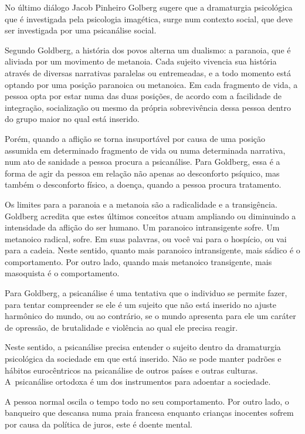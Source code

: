  

No último diálogo Jacob Pinheiro Golberg sugere que a dramaturgia
psicológica que é investigada pela psicologia imagética, surge num
contexto social, que deve ser investigada por uma psicanálise social.

Segundo Goldberg, a história dos povos alterna um dualismo: a paranoia,
que é aliviada por um movimento de metanoia. Cada sujeito vivencia sua
história através de diversas narrativas paralelas ou entremeadas, e a
todo momento está optando por uma posição paranoica ou metanoica. Em
cada fragmento de vida, a pessoa opta por estar numa das duas posições,
de acordo com a facilidade de integração, socialização ou mesmo da
própria sobrevivência dessa pessoa dentro do grupo maior no qual está
inserido.

Porém, quando a aflição se torna insuportável por causa de uma posição
assumida em determinado fragmento de vida ou numa determinada narrativa,
num ato de sanidade a pessoa procura a psicanálise. Para Goldberg, essa
é a forma de agir da pessoa em relação não apenas ao desconforto
psíquico, mas também o desconforto físico, a doença, quando a pessoa
procura tratamento.

Os limites para a paranoia e a metanoia são a radicalidade e a
transigência. Goldberg acredita que estes últimos conceitos atuam
ampliando ou diminuindo a intensidade da aflição do ser humano. Um
paranoico intransigente sofre. Um metanoico radical, sofre. Em suas
palavras, ou você vai para o hospício, ou vai para a cadeia. Neste
sentido, quanto mais paranoico intransigente, mais sádico é o
comportamento. Por outro lado, quando mais metanoico transigente, mais
masoquista é o comportamento.

Para Goldberg, a psicanálise é uma tentativa que o individuo se permite
fazer, para tentar compreender se ele é um sujeito que não está
inserido no ajuste harmônico do mundo, ou ao contrário, se o mundo
apresenta para ele um caráter de opressão, de brutalidade e violência ao
qual ele precisa reagir.

Neste sentido, a psicanálise precisa entender o sujeito dentro da
dramaturgia psicológica da sociedade em que está inserido. Não se pode
manter padrões e hábitos eurocêntricos na psicanálise de outros países e
outras culturas. A~psicanálise ortodoxa é um dos instrumentos para
adoentar a sociedade.

A pessoa normal oscila o tempo todo no seu comportamento. Por outro
lado, o banqueiro que descansa numa praia francesa enquanto crianças
inocentes sofrem por causa da política de juros, este é doente mental.

